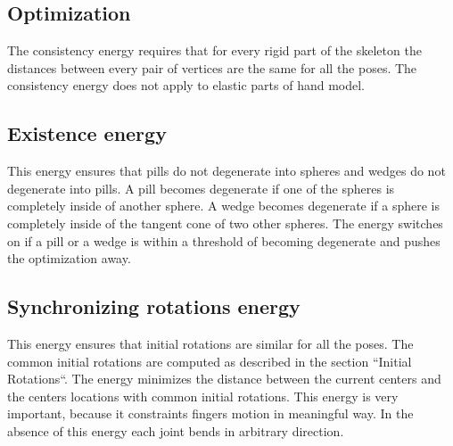 \subsection{Optimization}
The consistency energy requires that for every rigid part of the skeleton the distances between every pair of vertices are the same for all the poses. The consistency energy does not apply to elastic parts of hand model.

\subsection{Existence energy}
This energy ensures that pills do not degenerate into spheres and wedges do not degenerate into pills.
A pill becomes degenerate if one of the spheres is completely inside of another sphere. A wedge becomes degenerate if a sphere is completely inside of the tangent cone of two other spheres. The energy switches on if a pill or a wedge is within a threshold of becoming degenerate and pushes the optimization away.

\subsection{Synchronizing rotations energy}
This energy ensures that initial rotations are similar for all the poses. The common initial rotations are computed as described in the section ``Initial Rotations``. The energy minimizes the distance between the current centers and the centers locations with common initial rotations. 
This energy is very important, because it constraints fingers motion in meaningful way. In the absence of this energy each joint bends in arbitrary direction.
